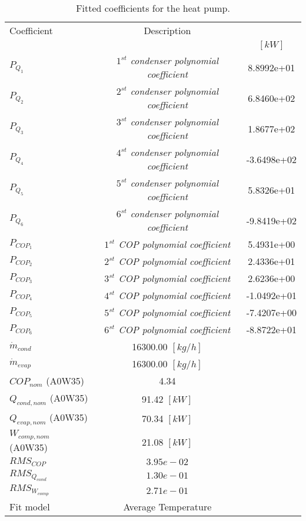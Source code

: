 \documentclass[english]{SPFShortReport}
\author{Dani Carbonell}
\begin{document}
\begin{table}[!ht]
\begin{small}
\caption{Fitted coefficients for the heat pump.}
\begin{center}
\resizebox{12cm}{!} 
{
\begin{tabular}{l | c c } 
\hline
\hline
Coefficient &Description & \\ 
 & &$[kW]$\\ 
\hline
$P_{Q_{1}}$ & \emph{$1^{st}$ condenser polynomial coefficient}  & 8.8992e+01    \\ 
$P_{Q_{2}}$ & \emph{$2^{st}$ condenser polynomial coefficient}  & 6.8460e+02    \\ 
$P_{Q_{3}}$ & \emph{$3^{st}$ condenser polynomial coefficient}  & 1.8677e+02    \\ 
$P_{Q_{4}}$ & \emph{$4^{st}$ condenser polynomial coefficient}  & -3.6498e+02    \\ 
$P_{Q_{5}}$ & \emph{$5^{st}$ condenser polynomial coefficient}  & 5.8326e+01    \\ 
$P_{Q_{6}}$ & \emph{$6^{st}$ condenser polynomial coefficient}  & -9.8419e+02    \\ 
\hline
$P_{COP_{1}}$ & \emph{$1^{st}$ COP polynomial coefficient}  & 5.4931e+00    \\ 
$P_{COP_{2}}$ & \emph{$2^{st}$ COP polynomial coefficient}  & 2.4336e+01    \\ 
$P_{COP_{3}}$ & \emph{$3^{st}$ COP polynomial coefficient}  & 2.6236e+00    \\ 
$P_{COP_{4}}$ & \emph{$4^{st}$ COP polynomial coefficient}  & -1.0492e+01    \\ 
$P_{COP_{5}}$ & \emph{$5^{st}$ COP polynomial coefficient}  & -7.4207e+00    \\ 
$P_{COP_{6}}$ & \emph{$6^{st}$ COP polynomial coefficient}  & -8.8722e+01    \\ 
\hline
$\dot m_{cond}$ & 16300.00 $[kg/h]$ \\ 
$\dot m_{evap}$ & 16300.00 $[kg/h]$ \\ 
\hline
$COP_{nom}$ (A0W35)& 4.34 \\ 
$Q_{cond,nom}$ (A0W35)& 91.42 $[kW]$\\ 
$Q_{evap,nom}$ (A0W35)& 70.34 $[kW]$\\ 
$W_{comp,nom}$ (A0W35)& 21.08 $[kW]$\\ 
\hline
 $RMS_{COP}$ & $3.95e-02$ \\ 
 $RMS_{Q_{cond}}$ & $1.30e-01$ \\ 
 $RMS_{W_{comp}}$ & $2.71e-01$ \\ 
\hline
Fit model & Average Temperature\\ 
\hline
\hline
\end{tabular}
}
\label{CoefTable}
\end{center}
\end{small}
\end{table}
\end{document}
